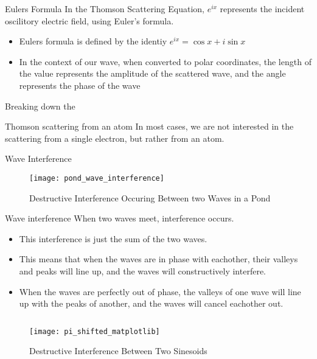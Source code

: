 \documentclass[aspectratio=169]{beamer}
\begin{document}
\begin{frame}[t]{Eulers Formula}
	In the Thomson Scattering Equation, $e^{ix}$ represents the incident oscilitory electric field, using Euler's formula.
	
	\begin{itemize}
		\item Eulers formula is defined by the identiy $ e^{ix} = \cos x + i \sin x $
		\item In the context of our wave, when converted to polar coordinates, the length of the value represents the amplitude of the scattered wave, and the angle represents the phase of the wave
	\end{itemize}
\end{frame}

\begin{frame}{Breaking down the }

\begin{frame}[t]{Thomson scattering from an atom}
	In most cases, we are not interested in the scattering from a single electron, but rather from an atom.
	
\end{frame}

\begingroup
\begin{frame}{Wave Interference}
	\begin{figure}
		\texttt{[image: pond\_wave\_interference]}
		
	\caption {Destructive Interference Occuring Between two Waves in a Pond}
	\end{figure}

\end{frame}
\endgroup

\begin{frame}{Wave interference}
	When two waves meet, interference occurs.
	\begin{itemize}
	\item This interference is just the sum of the two waves.
	\item This means that when the waves are in phase with eachother, their valleys and peaks will line up, and the waves will constructively interfere.
	\item When the waves are perfectly out of phase, the valleys of one wave will line up with the peaks of another, and the waves will cancel eachother out.
	\end{itemize}

	
\begin{columns}[c]	
	\begin{column}{.5\textwidth}
		\begin{figure}
		\texttt{[image: pi\_shifted\_matplotlib]}
		\caption{Destructive Interference Between Two Sinesoids}
		\end{figure}
	\end{column}
	


\end{columns}
\end{frame}
\end{frame}
\end{document}

